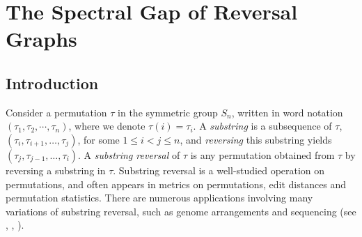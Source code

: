 

%





\chapter{The Spectral Gap of Reversal Graphs}

\section{Introduction}


Consider a permutation $\tau$ in the symmetric group $S_n$, written in 
word notation $(\tau_1, \tau_2, \cdots, \tau_n)$, where we denote $\tau(i) = \tau_i$.  
A \textit{substring} is a subsequence of $\tau$, $(\tau_i, \tau_{i+1}, \ldots, \tau_j)$,
for some $1 \leq i < j\leq n$, and \textit{reversing} this substring yields
$(\tau_j, \tau_{j-1}, \ldots, \tau_i)$.
A \textit{substring reversal} of $\tau$ is any permutation obtained from $\tau$
by reversing a substring in $\tau$. 
Substring reversal is a well-studied operation on permutations, and 
often  appears in metrics on permutations, edit distances
and permutation statistics. There are numerous applications involving many variations of substring reversal,
such as genome arrangements and sequencing  (see \cite{BafnaPevzner1996}, \cite{Hannenhalli1996}, \cite{KececiogluSankoff1995}). 

